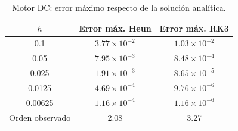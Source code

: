 \begin{table}[H]
\centering
\caption{Motor DC: error máximo respecto de la solución analítica.}
\label{tab:motor_dc}
\begin{tabular}{ccc}
\toprule
$h$ & Error máx. Heun & Error máx. RK3 \\
\midrule
0.1 & $3.77\times10^{-2}$ & $1.03\times10^{-2}$ \\
0.05 & $7.95\times10^{-3}$ & $8.48\times10^{-4}$ \\
0.025 & $1.91\times10^{-3}$ & $8.65\times10^{-5}$ \\
0.0125 & $4.69\times10^{-4}$ & $9.76\times10^{-6}$ \\
0.00625 & $1.16\times10^{-4}$ & $1.16\times10^{-6}$ \\
\midrule
Orden observado & 2.08 & 3.27 \\
\bottomrule
\end{tabular}
\end{table}
